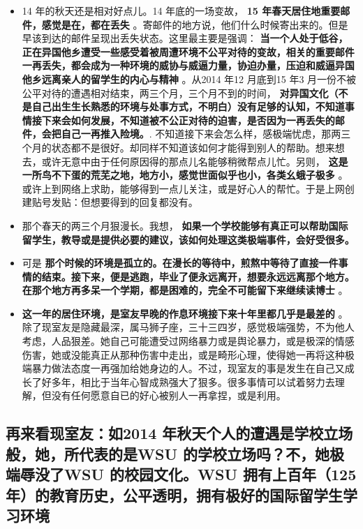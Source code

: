 \documentclass[9pt, b5paper]{article}
\begin{document}
\begin{itemize}
\item 14 年的秋天还是相对好点儿。14 年底的一场变故， \textbf{15 年春天居住地重要邮件，感觉是在，都在丢失} 。寄邮件的地方说，他们什么时候寄出来的。但是早该到达的邮件呈现出丢失状态。这里最主要是强调： \textbf{当一个人处于低谷，正在异国他乡遭受一些感受着被周遭环境不公平对待的变故，相关的重要邮件一再丢失，都会成为一种环境的威协与威逼力量，协迫办量，压迫和威逼异国他乡远离亲人的留学生的内心与精神} 。从2014 年12 月底到15 年3 月一份不被公平对待的遭遇相对结束，两三个月，三个月不到的时间， \textbf{对异国文化（不是自己出生生长熟悉的环境与处事方式，不明白）没有足够的认知，不知道事情接下来会如何发展，不知道被不公正对待的迫害，是否因为一再丢失的邮件，会把自己一再推入险境。}. 不知道接下来会怎么样，感极端忧虑，那两三个月的状态都不是很好。却同样不知道该如何才能得到别人的帮助。想来想去，或许无意中由于任何原因得的那点儿名能够稍微帮点儿忙。另则， \textbf{这是一所鸟不下蛋的荒芜之地，地方小，感觉世面似乎也小，各类幺蛾子极多} 。或许上到网络上求助，能够得到一点儿关注，或是好心人的帮忙。于是上网创建贴号发贴：但想要得到的回复都没有。
\item 那个春天的两三个月狠漫长。我想， \textbf{如果一个学校能够有真正可以帮助国际留学生，教导或是提供必要的建议，该如何处理这类极端事件，会好受很多。}
\item 可是 \textbf{那个时候的环境是孤立的。在漫长的等待中，煎熬中等待了直接一件事情的结束。接下来，便是逃跑，毕业了便永远离开，想要永远远离那个地方。在那个地方再多呆一个学期，都是困难的，完全不可能留下来继续读博士} 。
\item \textbf{这一年的居住环境，是室友早晚的作息环境接下来十年里都几乎是最差的} 。除了现室友是隐藏最深，属马狮子座，三十三四岁，感觉极端强势，不为他人考虑，人品狠差。她自己可能遭受过网络暴力或是舆论暴力，或是极深的情感伤害，她或没能真正从那种伤害中走出，或是畸形心理，使得她一再将这种极端暴力做法态度一再强加给她身边的人。不过，现室友的事是发生在自己又成长了好多年，相比于当年心智成熟强大了狠多。很多事情可以试着努力去理解，但没有任何愿意自已的好心被别人一再拿捏，或是利用。
\end{itemize}

\subsection{再来看现室友：如2014 年秋天个人的遭遇是学校立场般，她，所代表的是WSU 的学校立场吗？不，她极端辱没了WSU 的校园文化。WSU 拥有上百年（125 年）的教育历史，公平透明，拥有极好的国际留学生学习环境}
\label{sec-3-2}
\end{document}
